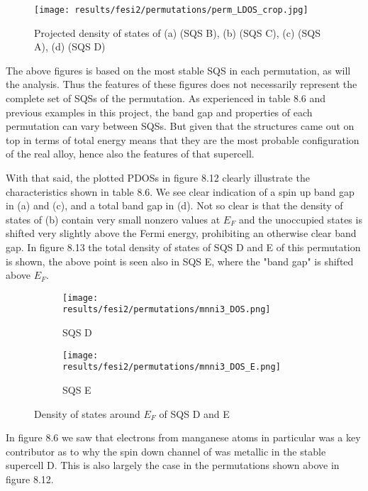 \begin{figure}[H]
\texttt{[image: results/fesi2/permutations/perm\_LDOS\_crop.jpg]}
\caption{Projected density of states of (a)  (SQS B), (b)  (SQS C), (c)  (SQS A), (d)  (SQS D)}
\end{figure}

The above figures is based on the most stable SQS in each permutation, as will the analysis. Thus the features of these figures does not necessarily represent the complete set of SQSs of the permutation. As experienced in table 8.6 and previous examples in this project, the band gap and properties of each permutation can vary between SQSs. But given that the structures came out on top in terms of total energy means that they are the most probable configuration of the real alloy, hence also the features of that supercell. 

With that said, the plotted PDOSs in figure 8.12 clearly illustrate the characteristics shown in table 8.6. We see clear indication of a spin up band gap in  (a) and  (c), and a total band gap in  (d). Not so clear is that the density of states of  (b) contain very small nonzero values at $E_F$ and the unoccupied states is shifted very slightly above the Fermi energy, prohibiting an otherwise clear band gap. In figure 8.13 the total density of states of SQS D and E of this permutation is shown, the above point is seen also in SQS E, where the "band gap" is shifted above $E_F$.
 
\begin{figure}[H]
	\begin{subfigure}{.5\textwidth}
		\texttt{[image: results/fesi2/permutations/mnni3\_DOS.png]}
		\caption{SQS D}
	\end{subfigure}
	\begin{subfigure}{.5\textwidth}
		\texttt{[image: results/fesi2/permutations/mnni3\_DOS\_E.png]}
		\caption{SQS E}
	\end{subfigure}
	\caption{Density of states around $E_F$ of SQS D and E }
\end{figure}


In figure 8.6 we saw that electrons from manganese atoms in particular was a key contributor as to why the spin down channel of  was metallic in the stable supercell D. This is also largely the case in the permutations shown above in figure 8.12.    
 
